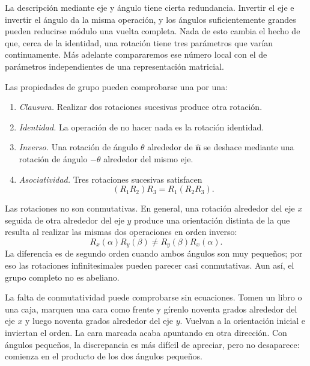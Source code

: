 La descripción mediante eje y ángulo tiene cierta redundancia. Invertir el eje e invertir el ángulo da la misma operación, y los ángulos suficientemente grandes pueden reducirse módulo una vuelta completa. Nada de esto cambia el hecho de que, cerca de la identidad, una rotación tiene tres parámetros que varían continuamente. Más adelante compararemos ese número local con el de parámetros independientes de una representación matricial.

Las propiedades de grupo pueden comprobarse una por una:
\begin{enumerate}
\item \emph{Clausura.} Realizar dos rotaciones sucesivas produce otra rotación.
\item \emph{Identidad.} La operación de no hacer nada es la rotación identidad.
\item \emph{Inverso.} Una rotación de ángulo \(\theta\) alrededor de \(\hat{\boldsymbol n}\) se deshace mediante una rotación de ángulo \(-\theta\) alrededor del mismo eje.
\item \emph{Asociatividad.} Tres rotaciones sucesivas satisfacen
\[
(R_1R_2)R_3=R_1(R_2R_3).
\]
\end{enumerate}

Las rotaciones no son conmutativas. En general, una rotación alrededor del eje \(x\) seguida de otra alrededor del eje \(y\) produce una orientación distinta de la que resulta al realizar las mismas dos operaciones en orden inverso:
\begin{equation}
R_x(\alpha)R_y(\beta)\ne R_y(\beta)R_x(\alpha).
\end{equation}
La diferencia es de segundo orden cuando ambos ángulos son muy pequeños; por eso las rotaciones infinitesimales pueden parecer casi conmutativas. Aun así, el grupo completo no es abeliano.

La falta de conmutatividad puede comprobarse sin ecuaciones. Tomen un libro o una caja, marquen una cara como frente y gírenlo noventa grados alrededor del eje \(x\) y luego noventa grados alrededor del eje \(y\). Vuelvan a la orientación inicial e inviertan el orden. La cara marcada acaba apuntando en otra dirección. Con ángulos pequeños, la discrepancia es más difícil de apreciar, pero no desaparece: comienza en el producto de los dos ángulos pequeños.

\begin{classroomqa}\end{classroomqa}

